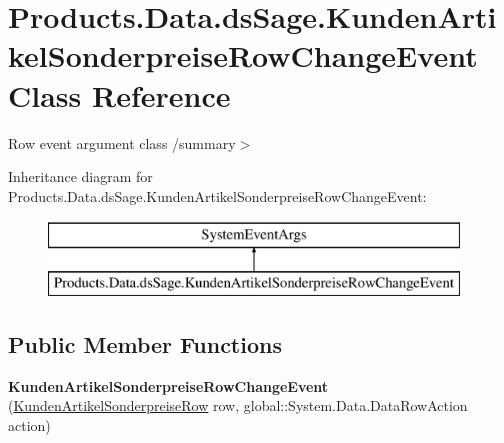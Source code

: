 \hypertarget{class_products_1_1_data_1_1ds_sage_1_1_kunden_artikel_sonderpreise_row_change_event}{}\section{Products.\+Data.\+ds\+Sage.\+Kunden\+Artikel\+Sonderpreise\+Row\+Change\+Event Class Reference}
\label{class_products_1_1_data_1_1ds_sage_1_1_kunden_artikel_sonderpreise_row_change_event}


Row event argument class /summary$>$  


Inheritance diagram for Products.\+Data.\+ds\+Sage.\+Kunden\+Artikel\+Sonderpreise\+Row\+Change\+Event\+:\begin{figure}[H]
\begin{center}
\leavevmode
\includegraphics[height=2.000000cm]{class_products_1_1_data_1_1ds_sage_1_1_kunden_artikel_sonderpreise_row_change_event}
\end{center}
\end{figure}
\subsection*{Public Member Functions}
\begin{DoxyCompactItemize}
\item 
{\bfseries Kunden\+Artikel\+Sonderpreise\+Row\+Change\+Event} (\hyperlink{class_products_1_1_data_1_1ds_sage_1_1_kunden_artikel_sonderpreise_row}{Kunden\+Artikel\+Sonderpreise\+Row} row, global\+::\+System.\+Data.\+Data\+Row\+Action action)\hypertarget{class_products_1_1_data_1_1ds_sage_1_1_kunden_artikel_sonderpreise_row_change_event_aabdd95a2cc94e820ece81d2608cd9fbd}{}\label{class_products_1_1_data_1_1ds_sage_1_1_kunden_artikel_sonderpreise_row_change_event_aabdd95a2cc94e820ece81d2608cd9fbd}

\end{DoxyCompactItemize}
